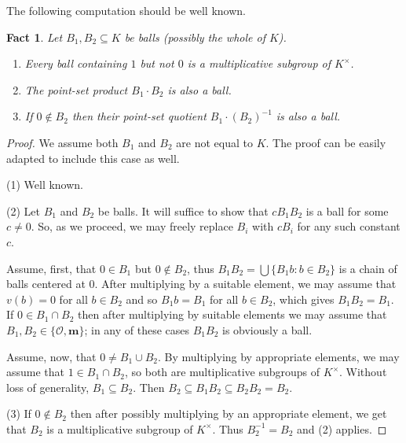 \documentclass[11pt]{amsart}
\newtheorem{fact}[theorem]{Fact}
\theoremstyle{definition}
\newcommand{\m}{\textbf{m}}
\newcommand{\CO}{{\mathcal O}}
\newcommand{\0}{\emptyset}
\def\sub{\subseteq}
\begin{document}
The following computation should be well known.


\begin{fact}\label{F:prod-balls} 
Let $B_1,B_2\subseteq K$ be  balls (possibly the whole of $K$).
\begin{enumerate} 
\item Every ball containing $1$ but not $0$  is a multiplicative subgroup    of $K^\times$.
\item The point-set product $B_1\cdot B_2$ is also a ball.

\item If $0\notin B_2$ then their point-set quotient $B_1\cdot (B_2)^{-1}$ is also a ball.
\end{enumerate}
\end{fact}
\begin{proof} 
We assume both $B_1$ and $B_2$ are not equal to $K$. The proof can be easily adapted to include this case as well.

(1) Well known.

(2) Let $B_1$ and $B_2$ be balls. It will suffice to show that $cB_1B_2$ is a ball for some $c\neq 0$. So, as we proceed,  we may freely replace $B_i$ with $cB_i$ for any such constant $c$. 

Assume, first, that $0\in B_1$ but $0\notin B_2$, thus $B_1B_2=\bigcup \{B_1b: b\in B_2\}$ is a chain of balls centered at $0$. After multiplying by a suitable element, we may assume that $v(b)=0$ for all $b\in B_2$ and so $B_1b=B_1$ for all $b\in B_2$, which gives $B_1B_2=B_1$. If $0\in B_1\cap B_2$ then after multiplying by suitable elements we may assume that $B_1,B_2\in \{\CO,\m\}$; in any of these cases $B_1B_2$ is obviously a ball.


Assume, now,  that $0\neq B_1\cup B_2$. By multiplying by appropriate elements, we may assume that $1\in B_1\cap B_2$, so both are multiplicative subgroups of $K^\times$. Without loss of generality,  $B_1\sub B_2$. Then $B_2\sub B_1B_2\sub B_2B_2=B_2$.


(3) If $0\notin  B_2$ then after possibly multiplying by an appropriate element, we get that $B_2$ is a multiplicative subgroup of $K^\times$. Thus $B_2^{-1}=B_2$ and (2) applies.
\end{proof}
\end{document}
